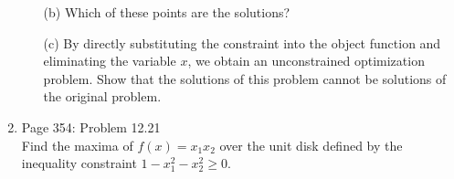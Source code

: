 \documentclass[11pt, oneside]{article}
\begin{document}
\begin{enumerate}
\begin{enumerate}
      \item[(b)]
        Which of these points are the solutions?

      \item[(c)]
        By directly substituting the constraint into the object function and
        eliminating the variable $x$, we obtain an unconstrained optimization
        problem.
        Show that the solutions of this problem cannot be solutions of the
        original problem.
    \end{enumerate}

  \item %
    Page 354: Problem 12.21 \\
    Find the maxima of $f(x) = x_1 x_2$ over the unit disk defined by the
    inequality constraint $1 - x_1^2 - x_2^2 \ge 0$.

\end{enumerate}
\end{document}
